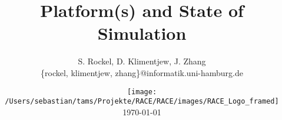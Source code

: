 




\title[Platforms and Simulation]{Platform(s) and State of Simulation}


\author[S. Rockel, D. Klimentjew, J. Zhang]{S. Rockel, D. Klimentjew, J. Zhang\textbf{}\\
{\small \{rockel, klimentjew, zhang\}@informatik.uni-hamburg.de\vspace{-1em}
}}


\date{\texttt{[image: /Users/sebastian/tams/Projekte/RACE/RACE/images/RACE\_Logo\_framed]}\\
\today}

\makebeamertitle


